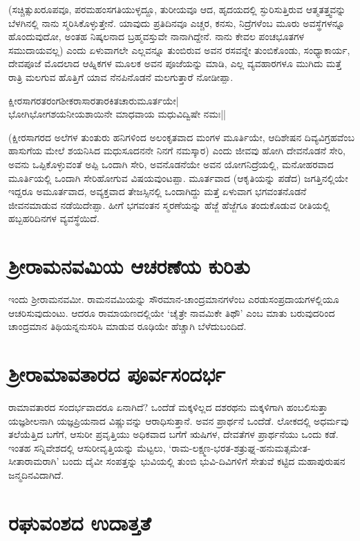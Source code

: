 (ಸಚ್ಚಿತ್ಸುಖರೂಪವೂ, ಪರಮಹಂಸಗತಿಯುಳ್ಳದ್ದೂ, ತುರೀಯವೂ ಆದ, ಹೃದಯದಲ್ಲಿ ಸ್ಫುರಿಸುತ್ತಿರುವ ಆತ್ಮತತ್ತ್ವವನ್ನು ಬೆಳಗಿನಲ್ಲಿ ನಾನು ಸ್ಮರಿಸಿಕೊಳ್ಳುತ್ತೇನೆ. ಯಾವುದು ಪ್ರತಿದಿನವೂ ಎಚ್ಚರ, ಕನಸು, ನಿದ್ರೆಗಳೆಂಬ ಮೂರು ಅವಸ್ಥೆಗಳನ್ನೂ ಹೊಂದುವುದೋ, ಅಂತಹ ನಿಷ್ಕಲನಾದ ಬ್ರಹ್ಮವಸ್ತುವೇ ನಾನಾಗಿದ್ದೇನೆ. ನಾನು ಕೇವಲ ಪಂಚಭೂತಗಳ ಸಮುದಾಯವಲ್ಲ) ಎಂದು ಏಳುವಾಗಲೇ ಎಲ್ಲವನ್ನೂ ತುಂಬಿರುವ ಅವನ ರಸವನ್ನೇ ತುಂಬಿಕೊಂಡು, ಸಂಧ್ಯಾಕಾರ್ಯ, ದೇವಪೂಜೆ ಮೊದಲಾದ ಆಹ್ನಿಕಗಳ ಮೂಲಕ ಅವನ ಪೂಜೆಯನ್ನು ಮಾಡಿ, ಎಲ್ಲ ವ್ಯವಹಾರಗಳೂ ಮುಗಿದು ಮತ್ತೆ ರಾತ್ರಿ ಮಲಗುವ ಹೊತ್ತಿಗೆ ಯಾವ ನೆನಪಿನೊಡನೆ ಮಲಗುತ್ತಾರೆ ನೋಡೀಪ್ಪಾ. 

\begin{shloka} 
ಕ್ಷೀರಸಾಗರತರಂಗಶೀಕರಾಸಾರತಾರಕಿತಚಾರುಮೂರ್ತಯೇ|\\ 
ಭೋಗಿಭೋಗಶಯನೀಯಶಾಯಿನೇ ಮಾಧವಾಯ ಮಧುವಿದ್ವಿಷೇ ನಮಃ||
\end{shloka} 

(ಕ್ಷೀರಸಾಗರದ ಅಲೆಗಳ ತುಂತುರು ಹನಿಗಳಿಂದ ಅಲಂಕೃತವಾದ ಮಂಗಳ ಮೂರ್ತಿಯೇ, ಆದಿಶೇಷನ ದಿವ್ಯವಿಗ್ರಹವೆಂಬ ಹಾಸುಗೆಯ ಮೇಲೆ ಶಯನಿಸಿದ ಮಧುಸೂದನನೇ ನಿನಗೆ ನಮಸ್ಕಾರ) ಎಂದು ಜೀವವು ಹೋಗಿ ದೇವನೊಡನೆ ಸೇರಿ, ಅವನು ಒಪ್ಪಿಕೊಳ್ಳುವಂತೆ ಅಪ್ಪಿ ಒಂದಾಗಿ ಸೇರಿ, ಅವನೊಡನೆಯೇ ಅವನ ಯೋಗನಿದ್ರೆಯಲ್ಲಿ, ಮನೋಹರವಾದ ಮೂರ್ತಿಯಲ್ಲಿ ಒಂದಾಗಿ ಸೇರಿಹೋಗುವ ವಿಷಯವುಂಟಪ್ಪಾ. ಮೂರ್ತವಾದ (ಆಕೃತಿಯನ್ನು ಪಡೆದ) ಜಗತ್ತಿನಲ್ಲಿಯೇ ಇದ್ದರೂ ಅಮೂರ್ತವಾದ, ಅವ್ಯಕ್ತವಾದ ತೇಜಸ್ಸಿನಲ್ಲಿ ಒಂದಾಗಿದ್ದು ಮತ್ತೆ ಏಳುವಾಗ ಭಗವಂತನೊಡನೆ ಜೀವನಮಾಡುವ ನಡೆಯಿದೇಪ್ಪಾ. ಹೀಗೆ ಭಗವಂತನ ಸ್ಮರಣೆಯನ್ನು ಹೆಜ್ಜೆ ಹೆಜ್ಜೆಗೂ ತಂದುಕೊಡುವ ರೀತಿಯಲ್ಲಿ ಹಬ್ಬಹರಿದಿನಗಳ ವ್ಯವಸ್ಥೆಯಿದೆ. 

\section*{ಶ್ರೀರಾಮನವಮಿಯ ಆಚರಣೆಯ ಕುರಿತು} 

ಇಂದು ಶ್ರೀರಾಮನವಮೀ. ರಾಮನವಮಿಯನ್ನು ಸೌರಮಾನ-ಚಾಂದ್ರಮಾನಗಳೆಂಬ ಎರಡುಸಂಪ್ರದಾಯಗಳಲ್ಲಿಯೂ ಆಚರಿಸುವುದುಂಟು. ಆದರೂ ರಾಮಾಯಣದಲ್ಲಿಯೇ `ಚೈತ್ರೇ ನಾವಮಿಕೇ ತಿಥೌ' ಎಂಬ ಮಾತು ಬರುವುದರಿಂದ ಚಾಂದ್ರಮಾನ ತಿಥಿಯನ್ನನುಸರಿಸಿ ಮಾಡುವ ರೂಢಿಯೇ ಹೆಚ್ಚಾಗಿ ಬೆಳೆದುಬಂದಿದೆ. 

\section*{ಶ್ರೀರಾಮಾವತಾರದ ಪೂರ್ವಸಂದರ್ಭ}

ರಾಮಾವತಾರದ ಸಂದರ್ಭವಾದರೂ ಏನಾಗಿದೆ? ಒಂದೆಡೆ ಮಕ್ಕಳಿಲ್ಲದ ದಶರಥನು ಮಕ್ಕಳಿಗಾಗಿ ಹಂಬಲಿಸುತ್ತಾ ಯಜ್ಞಶೀಲನಾಗಿ ಯಜ್ಞಪ್ರಿಯನಾದ ವಿಷ್ಣುವನ್ನು ಆರಾಧಿಸುತ್ತಾನೆ. ಅವನ ಪ್ರಾರ್ಥನೆ ಒಂದೆಡೆ. ಲೋಕದಲ್ಲಿ ಅಧರ್ಮವು ತಲೆಯೆತ್ತಿದ ಬಗೆಗೆ, ಆಸುರೀ ಪ್ರವೃತ್ತಿಯು ಅಧಿಕವಾದ ಬಗೆಗೆ ಋಷಿಗಳ, ದೇವತೆಗಳ ಪ್ರಾರ್ಥನೆಯು ಒಂದು ಕಡೆ. ಇಂತಹ ಸನ್ನಿವೇಶದಲ್ಲಿ ಆಸುರೀವೃತ್ತಿಯನ್ನು ಮೆಟ್ಟಲು, `ರಾಮ-ಲಕ್ಷ್ಮಣ-ಭರತ-ಶತ್ರುಘ್ನ-ಹನುಮತ್ಸಮೇತ-ಸೀತಾರಾಮರಾಗಿ' ಬಂದು ದೈವೀ ಸಂಪತ್ತನ್ನು ಭುವಿಯಲ್ಲಿ ತುಂಬಿ ಭುವಿ-ದಿವಿಗಳಿಗೆ ಸೇತುವೆ ಕಟ್ಟಿದ ಮಹಾಪುರುಷನ ಜನ್ಮದಿನವಿದಾಗಿದೆ. 

\section*{ರಘುವಂಶದ ಉದಾತ್ತತೆ} 

